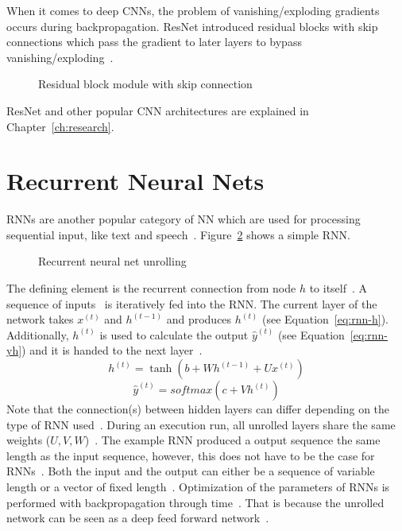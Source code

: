 When it comes to deep \acp{CNN}, the problem of vanishing/exploding gradients occurs during
backpropagation.
ResNet introduced residual blocks with skip connections which pass the gradient to later layers
to bypass vanishing/exploding~\citep{he_deep_2015}.
\begin{figure}[ht]
    \centering
    \caption{Residual block module with skip connection~\citep{he_deep_2015}\label{fig:skip-conn}}
\end{figure}
ResNet and other popular \ac{CNN} architectures are explained in Chapter~\ref{ch:research}.

\section{Recurrent Neural Nets}
\acp{RNN} are another popular category of \ac{NN} which are used for processing sequential input,
like text and speech~\citep{chauhan_review_2018}.
Figure~\ref{fig:rnn-unrolling} shows a simple \ac{RNN}.
\begin{figure}[ht]
    \centering
    \caption{Recurrent neural net unrolling~\citep{goodfellow_deep_2016}\label{fig:rnn-unrolling}}
\end{figure}
The defining element is the recurrent connection from node $h$ to itself~\citep{goodfellow_deep_2016}.
A sequence of inputs \x\ is iteratively fed into the \ac{RNN}.
The current layer of the network takes $x^{(t)}$ and $h^{(t-1)}$ and produces $h^{(t)}$
(see Equation~\ref{eq:rnn-h}).
Additionally, $h^{(t)}$ is used to calculate the output $\hat{y}^{(t)}$ (see Equation~\ref{eq:rnn-yh})
and it is handed to the next layer~\citep{goodfellow_deep_2016}.
\begin{equation}\label{eq:rnn-h}
    h^{(t)} = \tanh(b+Wh^{(t-1)}+Ux^{(t)})
\end{equation}
\begin{equation}\label{eq:rnn-yh}
    \hat{y}^{(t)} = softmax(c + Vh^{(t)})
\end{equation}
Note that the connection(s) between hidden layers can differ depending on the type of \ac{RNN}
used~\citep{goodfellow_deep_2016}.
During an execution run, all unrolled layers share the same weights
($U,V,W$)~\citep{chauhan_review_2018}.
The example \ac{RNN} produced a output sequence the same length as the input
sequence, however, this does not have to be the case for \acp{RNN}~\citep{goodfellow_deep_2016}.
Both the input and the output can either be a sequence of variable length or a vector of fixed
length~\citep{goodfellow_deep_2016}.
Optimization of the parameters of \acp{RNN} is performed with backpropagation through
time~\citep{sherstinsky_fundamentals_2020}.
That is because the unrolled network can be seen as a deep feed forward
network~\citep{chauhan_review_2018}.

